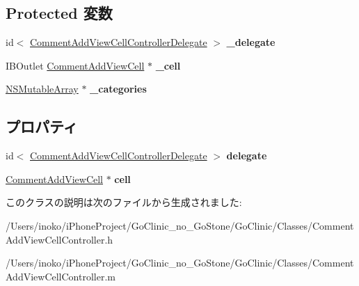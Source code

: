 \subsection*{Protected 変数}
\begin{DoxyCompactItemize}
\item 
\hypertarget{interface_comment_add_view_cell_controller_a3e6da360df77b6f0d4b9985623472391}{
id$<$ \hyperlink{protocol_comment_add_view_cell_controller_delegate-p}{CommentAddViewCellControllerDelegate} $>$ {\bfseries \_\-delegate}}
\label{interface_comment_add_view_cell_controller_a3e6da360df77b6f0d4b9985623472391}

\item 
\hypertarget{interface_comment_add_view_cell_controller_aea5e16eb45eda0dc4c40f0bb1d28bf21}{
IBOutlet \hyperlink{interface_comment_add_view_cell}{CommentAddViewCell} $\ast$ {\bfseries \_\-cell}}
\label{interface_comment_add_view_cell_controller_aea5e16eb45eda0dc4c40f0bb1d28bf21}

\item 
\hypertarget{interface_comment_add_view_cell_controller_afca103f5e89b63e6c52a3646e3b07508}{
\hyperlink{class_n_s_mutable_array}{NSMutableArray} $\ast$ {\bfseries \_\-categories}}
\label{interface_comment_add_view_cell_controller_afca103f5e89b63e6c52a3646e3b07508}

\end{DoxyCompactItemize}
\subsection*{プロパティ}
\begin{DoxyCompactItemize}
\item 
\hypertarget{interface_comment_add_view_cell_controller_ae12f749b163024ff5ea15e23aaaf5a3a}{
id$<$ \hyperlink{protocol_comment_add_view_cell_controller_delegate-p}{CommentAddViewCellControllerDelegate} $>$ {\bfseries delegate}}
\label{interface_comment_add_view_cell_controller_ae12f749b163024ff5ea15e23aaaf5a3a}

\item 
\hypertarget{interface_comment_add_view_cell_controller_a7e720ff244ee58abe88d45e9cd7612af}{
\hyperlink{interface_comment_add_view_cell}{CommentAddViewCell} $\ast$ {\bfseries cell}}
\label{interface_comment_add_view_cell_controller_a7e720ff244ee58abe88d45e9cd7612af}

\end{DoxyCompactItemize}


このクラスの説明は次のファイルから生成されました:\begin{DoxyCompactItemize}
\item 
/Users/inoko/iPhoneProject/GoClinic\_\-no\_\-GoStone/GoClinic/Classes/CommentAddViewCellController.h\item 
/Users/inoko/iPhoneProject/GoClinic\_\-no\_\-GoStone/GoClinic/Classes/CommentAddViewCellController.m\end{DoxyCompactItemize}
